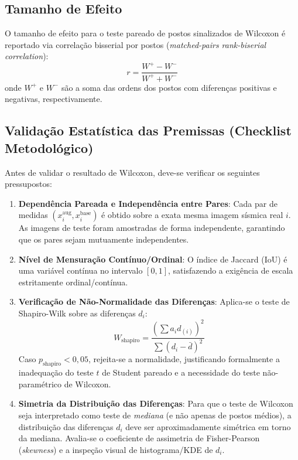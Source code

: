 \documentclass[11pt,a4paper]{article}
\begin{document}
\subsection{Tamanho de Efeito}
O tamanho de efeito para o teste pareado de postos sinalizados de Wilcoxon é reportado via correlação bisserial por postos (\textit{matched-pairs rank-biserial correlation}):
\begin{equation}
r = \frac{W^+ - W^-}{W^+ + W^-}
\end{equation}
onde $W^+$ e $W^-$ são a soma das ordens dos postos com diferenças positivas e negativas, respectivamente.

\subsection{Validação Estatística das Premissas (Checklist Metodológico)}
Antes de validar o resultado de Wilcoxon, deve-se verificar os seguintes pressupostos:
\begin{enumerate}
    \item \textbf{Dependência Pareada e Independência entre Pares}: Cada par de medidas $(x_i^{\text{aug}}, x_i^{\text{base}})$ é obtido sobre a exata mesma imagem sísmica real $i$. As imagens de teste foram amostradas de forma independente, garantindo que os pares sejam mutuamente independentes.
    \item \textbf{Nível de Mensuração Contínuo/Ordinal}: O índice de Jaccard (IoU) é uma variável contínua no intervalo $[0, 1]$, satisfazendo a exigência de escala estritamente ordinal/contínua.
    \item \textbf{Verificação de Não-Normalidade das Diferenças}: Aplica-se o teste de Shapiro-Wilk sobre as diferenças $d_i$:
    \begin{equation}
    W_{\text{shapiro}} = \frac{\left(\sum a_i d_{(i)}\right)^2}{\sum (d_i - \bar{d})^2}
    \end{equation}
    Caso $p_{\text{shapiro}} < 0{,}05$, rejeita-se a normalidade, justificando formalmente a inadequação do teste $t$ de Student pareado e a necessidade do teste não-paramétrico de Wilcoxon.
    \item \textbf{Simetria da Distribuição das Diferenças}: Para que o teste de Wilcoxon seja interpretado como teste de \textit{mediana} (e não apenas de postos médios), a distribuição das diferenças $d_i$ deve ser aproximadamente simétrica em torno da mediana. Avalia-se o coeficiente de assimetria de Fisher-Pearson (\textit{skewness}) e a inspeção visual de histograma/KDE de $d_i$.
\end{enumerate}
\end{document}
